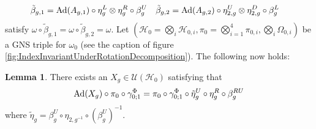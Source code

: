 \documentclass[12pt,a4paper,twoside]{article}
\let\originalleft\left
\let\originalright\right
\renewcommand{\left}{\mathopen{}\mathclose\bgroup\originalleft}
\renewcommand{\right}{\aftergroup\egroup\originalright}
\newcommand{\UU}{\mathcal U}
\newcommand{\HH}{\mathcal H}
\newcommand{\Ad}[1]{\textrm{Ad}\left(#1\right)}
\theoremstyle{definition}
\newtheorem{lemma}[theorem]{Lemma}
\numberwithin{equation}{section}
\begin{document}
\begin{align}
	\tilde{\beta}_{g,1}&=\Ad{A_{g,1}}\circ\eta_g^L\otimes\eta_g^R\circ\beta_g^U&\tilde{\beta}_{g,2}&=\Ad{A_{g,2}}\circ\eta_{2,g}^U\otimes\eta_{2,g}^D\circ\beta_g^L
\end{align}
satisfy $\omega\circ\tilde{\beta}_{g,1}=\omega\circ\tilde{\beta}_{g,2}=\omega$. Let $(\HH_0=\bigotimes_i\HH_{0,i},\pi_0=\bigotimes_{i=1}^4\pi_{0,i},\bigotimes_i\Omega_{0,i})$ be a GNS triple for $\omega_0$ (see the caption of figure \ref{fig:IndexInvariantUnderRotationDecomposition}). The following now holds:
\begin{lemma}\label{lem:DefinitionX_gLemma}
	There exists an $X_g\in\UU(\HH_0)$ satisfying that
	\begin{equation}\label{eq:DefinitionX_gLemma}
		\Ad{X_g}\circ\pi_0\circ\gamma^\Phi_{0;1}=\pi_0\circ\gamma^\Phi_{0;1}\circ\tilde{\eta}^U_g\circ\eta^R_g\circ\beta_g^{RU}
	\end{equation}
	where $\tilde{\eta}_g=\beta_g^U\circ\eta_{2,g^{-1}}\circ(\beta_g^U)^{-1}$.
\end{lemma}
\end{document}
